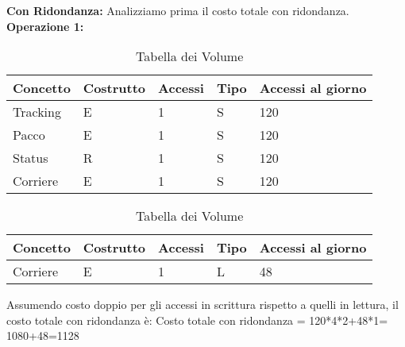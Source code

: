 \textbf{Con Ridondanza:} Analizziamo prima il costo totale con ridondanza.
\textbf{Operazione 1:} 
     \begin{center}
        \begin{table}[]
        \centering
        \begin{tabular} {|m{5em}|m{5em}|m{5em}|m{5em}|m{5em}|}
        \hline
        \textbf{Concetto} & \textbf{Costrutto} & \textbf{Accessi} & \textbf{Tipo} & \textbf{Accessi al giorno}\\ [0.5ex]
        \hline\hline
            Tracking & E & 1 & S & 120\\
            \hline
            Pacco & E & 1 & S & 120\\
            \hline
            Status & R & 1 & S & 120\\
            \hline
            Corriere & E & 1 & S & 120\\
            \hline
           \end{tabular}
            \caption{Tabella dei Volume}
    \end{table}
\end{center}
    \begin{center}

        \begin{table}[]
        \centering
        \begin{tabular} {|m{5em}|m{5em}|m{5em}|m{5em}|m{5em}}
        \hline
        \textbf{Concetto} & \textbf{Costrutto} & \textbf{Accessi} & \textbf{Tipo} & \textbf{Accessi al giorno}\\ [0.5ex]
        \hline\hline
            Corriere & E & 1 & L & 48\\
            \hline
           \end{tabular}
            \caption{Tabella dei Volume}
    \end{table}
\end{center}
Assumendo costo doppio per gli accessi in scrittura rispetto a quelli in lettura, il costo totale con ridondanza è:
Costo totale con ridondanza = 120*4*2+48*1= 1080+48=1128

